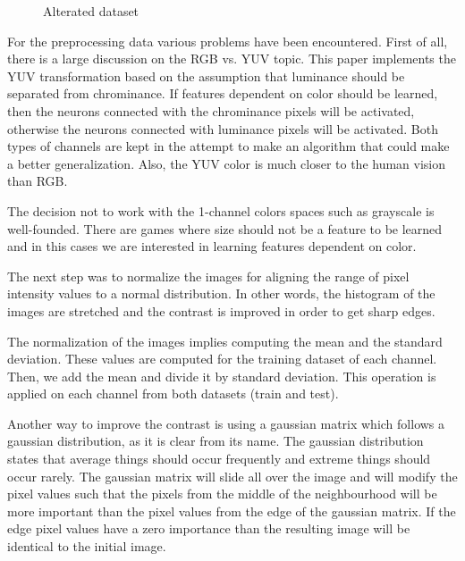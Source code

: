 \begin{figure}[h]
	\begin{center}
		\caption{Alterated dataset} \label{fig:states}
    \end{center}
\end{figure}
\newpage

For the preprocessing data various problems have been encountered. First of all, there is a large discussion on the RGB vs. YUV topic. This paper implements the YUV transformation based on the assumption that luminance should be separated from chrominance. If features dependent on color should be learned, then the neurons connected with the chrominance pixels will be activated, otherwise the neurons connected with luminance pixels will be activated. Both types of channels are kept in the attempt to make an algorithm that could make a better generalization.  Also, the YUV color is much closer to the human vision than RGB. 

The decision not to work with the 1-channel colors spaces such as grayscale is well-founded. There are games where size should not be a feature to be learned and in this cases we are interested in learning features dependent on color.

The next step was to normalize the images for aligning the range of pixel intensity values to a normal distribution. In other words, the histogram of the images are stretched and the contrast is improved in order to get sharp edges.

The normalization of the images implies computing the mean and the standard deviation. These values are computed for the training dataset of each channel. Then, we add the mean and divide it by standard deviation. This operation is applied on each channel from both datasets (train and test).

Another way to improve the contrast is using a gaussian matrix which follows a gaussian distribution, as it is clear from its name. The gaussian distribution states that average things should occur frequently and extreme things should occur rarely. The gaussian matrix will slide all over the image and will modify the pixel values such that the pixels from the middle of the neighbourhood will be more important than the pixel values from the edge of the gaussian matrix. If the edge pixel values have a zero importance than the resulting image will be identical to the initial image.

